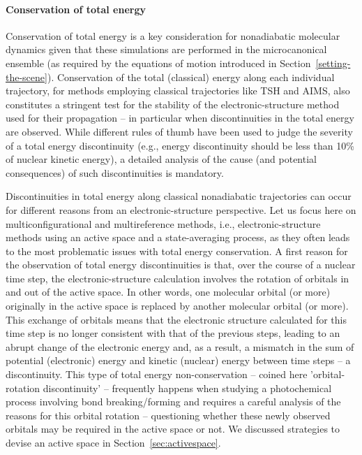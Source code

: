 \documentclass[9pt,bestpractices,pubversion]{livecoms}
\begin{document}
\paragraph{Conservation of total energy}
Conservation of total energy is a key consideration for nonadiabatic molecular dynamics given that these simulations are performed in the microcanonical ensemble (as required by the equations of motion introduced in Section~\ref{setting-the-scene}). Conservation of the total (classical) energy along each individual trajectory, for methods employing classical trajectories like TSH and AIMS, also constitutes a stringent test for the stability of the electronic-structure method used for their propagation -- in particular when discontinuities in the total energy are observed. While different rules of thumb have been used to judge the severity of a total energy discontinuity (e.g., energy discontinuity should be less than 10\% of nuclear kinetic energy), a detailed analysis of the cause (and potential consequences) of such discontinuities is mandatory.

Discontinuities in total energy along classical nonadiabatic trajectories can occur for different reasons from an electronic-structure perspective. Let us focus here on multiconfigurational and multireference methods, i.e., electronic-structure methods using an active space and a state-averaging process, as they often leads to the most problematic issues with total energy conservation. A first reason for the observation of total energy discontinuities is that, over the course of a nuclear time step, the electronic-structure calculation involves the rotation of orbitals in and out of the active space. In other words, one molecular orbital (or more) originally in the active space is replaced by another molecular orbital (or more). This exchange of orbitals means that the electronic structure calculated for this time step is no longer consistent with that of the previous steps, leading to an abrupt change of the electronic energy and, as a result, a mismatch in the sum of potential (electronic) energy and kinetic (nuclear) energy between time steps -- a discontinuity. This type of total energy non-conservation -- coined here 'orbital-rotation discontinuity' -- frequently happens when studying a photochemical process involving bond breaking/forming and requires a careful analysis of the reasons for this orbital rotation -- questioning whether these newly observed orbitals may be required in the active space or not. We discussed strategies to devise an active space in Section~\ref{sec:activespace}. 
\end{document}
